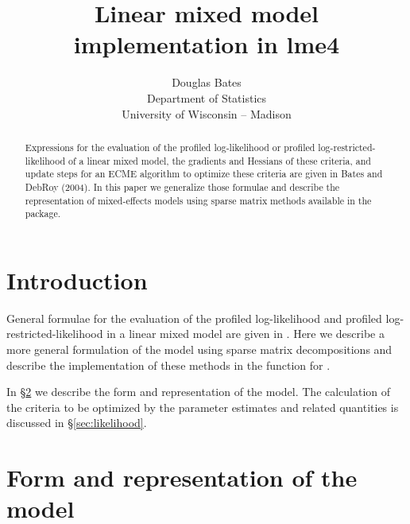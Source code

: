 \documentclass[12pt]{article}
\begin{document}
\title{Linear mixed model implementation in lme4}
\author{Douglas Bates\\Department of Statistics\\University of
  Wisconsin -- Madison\\}
\maketitle
\begin{abstract}
  Expressions for the evaluation of the profiled log-likelihood or
  profiled log-restricted-likelihood of a linear mixed model, the
  gradients and Hessians of these criteria, and update steps for an
  ECME algorithm to optimize these criteria are given in Bates and
  DebRoy (2004). In this paper we generalize those formulae and
  describe the representation of mixed-effects models using sparse
  matrix methods available in the  package.
\end{abstract}

\section{Introduction}
\label{sec:Intro}

General formulae for the evaluation of the profiled log-likelihood and
profiled log-restricted-likelihood in a linear mixed model are given
in \citet{bate:debr:2004}.  Here we describe a more general
formulation of the model using sparse matrix decompositions and
describe the implementation of these methods in the 
function for \RR{}.

In \S\ref{sec:Form} we describe the form and representation of the
model.  The calculation of the criteria to be optimized by the
parameter estimates and related quantities is discussed in
\S\ref{sec:likelihood}.


\section{Form and representation of the model}
\label{sec:Form}
\end{document}
